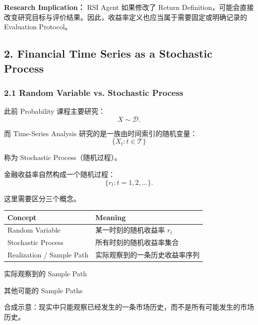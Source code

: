 \textbf{Research Implication：} RSI Agent 如果修改了 Return Definition，可能会直接改变研究目标与评价结果。因此，收益率定义也应当属于需要固定或明确记录的 Evaluation Protocol。

\hypertarget{part-4-52-0001-financial-time-series-as-a-stochastic-process}{%
\subsection{2. Financial Time Series as a Stochastic Process}\label{part-4-52-0001-financial-time-series-as-a-stochastic-process}}

\hypertarget{part-4-52-0001-random-variable-vs.-stochastic-process}{%
\subsubsection{2.1 Random Variable vs. Stochastic Process}\label{part-4-52-0001-random-variable-vs.-stochastic-process}}

此前 Probability 课程主要研究：
\[X\sim\mathcal D.\]

而 Time-Series Analysis 研究的是一族由时间索引的随机变量：
\[\boxed{
\{X_t:t\in\mathcal T\}
}\]

称为 Stochastic Process（随机过程）。

金融收益率自然构成一个随机过程：
\[\{r_t:t=1,2,\ldots\}.\]

这里需要区分三个概念。

\begin{readertable}
\begin{longtable}[]{@{}
  >{\raggedright\arraybackslash}p{}
  >{\raggedright\arraybackslash}p{}@{}}
\toprule
Concept & Meaning \\
\midrule
\endhead
Random Variable & 某一时刻的随机收益率 \(r_t\) \\
Stochastic Process & 所有时刻的随机收益率集合 \\
Realization / Sample Path & 实际观察到的一条历史收益率序列 \\
\bottomrule
\end{longtable}
\end{readertable}


实际观察到的 Sample Path

其他可能的 Sample Paths

合成示意：现实中只能观察已经发生的一条市场历史，而不是所有可能发生的市场历史。

